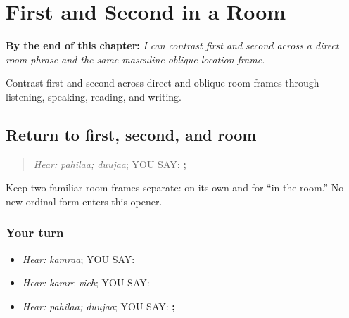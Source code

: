 
\chapter{First and Second in a Room}
\label{ch:pa-a2-ordinal-e}

\begin{chapteropening}
\textbf{By the end of this chapter:} \emph{I can contrast first and second across a direct room phrase and the same masculine oblique location frame.}

Contrast first and second across direct and oblique room frames through listening, speaking, reading, and writing.
\end{chapteropening}

\section[\texorpdfstring{\pa{ਪਹਿਲਾ} · \pa{ਦੂਜਾ} … (pahilaa; duujaa …)}{ਪਹਿਲਾ · ਦੂਜਾ … (pahilaa; duujaa …)}]{Return to first, second, and room}

\label{lesson:PA-C193-ordinal-return}



\begin{quote}
\emph{Hear:} \emph{pahilaa; duujaa}; YOU SAY: \textbf{; }
\end{quote}

\begin{grammarlens}[title={Grammar Lens}]
Keep two familiar room frames separate: \textbf{} on its own and \textbf{ } for “in the room.” No new ordinal form enters this opener.
\end{grammarlens}

\subsection*{Your turn}
\begin{itemize}
\raggedright
  \item \emph{Hear:} \emph{kamraa}; YOU SAY: \textbf{}
  \item \emph{Hear:} \emph{kamre vich}; YOU SAY: \textbf{ }
  \item \emph{Hear:} \emph{pahilaa; duujaa}; YOU SAY: \textbf{; }
\end{itemize}

